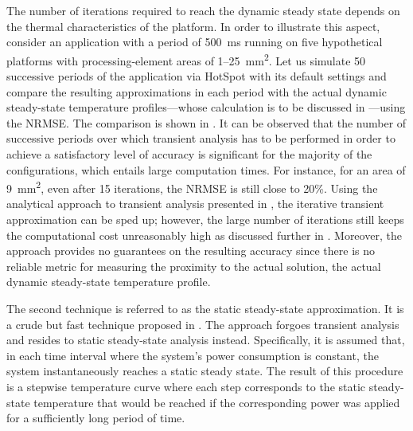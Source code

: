 The number of iterations required to reach the dynamic steady state depends on
the thermal characteristics of the platform. In order to illustrate this aspect,
consider an application with a period of 500~ms running on five hypothetical
platforms with processing-element areas of 1--25~mm\textsuperscript{2}. Let us
simulate 50 successive periods of the application via HotSpot with its default
settings and compare the resulting approximations in each period with the actual
dynamic steady-state temperature profiles---whose calculation is to be discussed
in ---using the \ac{NRMSE}. The comparison
is shown in . It can be observed that
the number of successive periods over which transient analysis has to be
performed in order to achieve a satisfactory level of accuracy is significant
for the majority of the configurations, which entails large computation times.
For instance, for an area of 9~mm\textsuperscript{2}, even after 15 iterations,
the \ac{NRMSE} is still close to 20\%. Using the analytical approach to
transient analysis presented in , the iterative
transient approximation can be sped up; however, the large number of iterations
still keeps the computational cost unreasonably high as discussed further in
. Moreover, the approach provides no
guarantees on the resulting accuracy since there is no reliable metric for
measuring the proximity to the actual solution, the actual dynamic steady-state
temperature profile.

The second technique is referred to as the static steady-state approximation. It
is a crude but fast technique proposed in \cite{huang2009b}. The approach
forgoes transient analysis and resides to static steady-state analysis instead.
Specifically, it is assumed that, in each time interval where the system's power
consumption is constant, the system instantaneously reaches a static steady
state. The result of this procedure is a stepwise temperature curve where each
step corresponds to the static steady-state temperature that would be reached if
the corresponding power was applied for a sufficiently long period of time.

